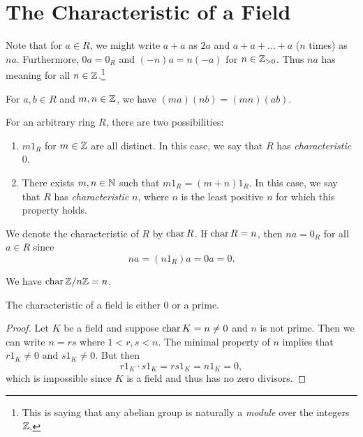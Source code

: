 \section{The Characteristic of a Field}
Note that for $a \in R$, we might write $a + a$ as
$2a$ and $a + a + \dots + a$ ($n$ times) as $na$.
Furthermore, $0a = 0_R$ and $(-n)a = n(-a)$ for
$n \in \mathbb{Z}_{> 0}$. Thus $na$ has meaning for all
$n \in \mathbb{Z}$.\footnote{This is saying that any abelian group is naturally a \emph{module} over the integers $\mathbb{Z}$.}

\begin{exercise}
  For $a, b \in R$ and $m, n \in \mathbb{Z}$, we have
  $(ma)(nb) = (mn)(ab)$.
\end{exercise}

\begin{definition}
For an arbitrary ring $R$, there are two possibilities:
\begin{enumerate}
  \item $m 1_R$ for $m \in \mathbb{Z}$ are all distinct. In
    this case, we say that $R$ has \emph{characteristic}
    $0$.
  \item There exists $m, n \in \mathbb{N}$ such that
    $m 1_R = (m + n) 1_R$. In this case, we say that
    $R$ has \emph{characteristic} $n$, where $n$ is
    the least positive $n$ for which this property
    holds.
\end{enumerate}
We denote the characteristic of $R$ by $\operatorname{char} R$.
If $\operatorname{char} R = n$, then $na = 0_R$ for all $a \in R$
since \[na = (n 1_R) a = 0a = 0.\]
\end{definition}

\begin{example}
  We have $\operatorname{char} \mathbb{Z} / n\mathbb{Z} = n$.
\end{example}

\begin{theorem}
  The characteristic of a field is either $0$ or a prime.
\end{theorem}

\begin{proof}
  Let $K$ be a field and suppose $\operatorname{char} K = n \ne 0$
  and $n$ is not prime. Then we can write $n = rs$ where
  $1 < r, s < n$. The minimal property of $n$
  implies that $r 1_K \ne 0$ and $s 1_K \ne 0$. But then
  \[
    r 1_K \cdot s 1_K = rs 1_K = n 1_K = 0,
  \]
  which is impossible since $K$ is a field and thus
  has no zero divisors.
\end{proof}

